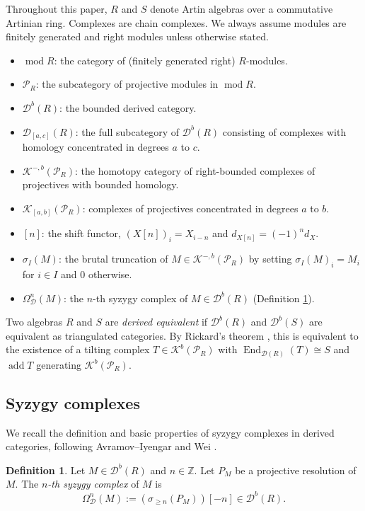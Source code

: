 \documentclass[12pt,a4paper,reqno]{amsart}
\theoremstyle{plain}
\theoremstyle{definition}
\newtheorem{definition}[theorem]{Definition}
\theoremstyle{remark}
\DeclareMathOperator{\modd}{mod}
\DeclareMathOperator{\End}{End}
\DeclareMathOperator{\add}{add}
\newcommand{\D}{\mathcal{D}}
\newcommand{\Db}{\mathcal{D}^b}
\newcommand{\K}{\mathcal{K}}
\newcommand{\PR}{\mathcal{P}_R}
\newcommand{\syz}{\Omega_{\mathcal{D}}}
\begin{document}
Throughout this paper, $R$ and $S$ denote Artin algebras over a commutative Artinian ring. Complexes are chain complexes. We always assume modules are finitely generated and right modules unless otherwise stated.

\begin{itemize}
\item $\modd R$: the category of (finitely generated right) $R$-modules.
\item $\PR$: the subcategory of projective modules in $\modd R$.
\item $\Db(R)$: the bounded derived category.
\item $\D_{[a,c]}(R)$: the full subcategory of $\Db(R)$ consisting of complexes with homology concentrated in degrees $a$ to $c$.
\item $\K^{-,b}(\PR)$: the homotopy category of right-bounded complexes of projectives with bounded homology.
\item $\K_{[a,b]}(\PR)$: complexes of projectives concentrated in degrees $a$ to $b$.
\item $[n]$: the shift functor, $(X[n])_i = X_{i-n}$ and $d_{X[n]} = (-1)^n d_X$.
\item $\sigma_I(M)$: the brutal truncation of $M \in \K^{-,b}(\PR)$ by setting $\sigma_I(M)_i = M_i$ for $i\in I$ and $0$ otherwise.
\item $\syz^n(M)$: the $n$-th syzygy complex of $M\in \Db(R)$ (Definition \ref{def:syzygy}).
\end{itemize}

Two algebras $R$ and $S$ are \emph{derived equivalent} if $\Db(R)$ and $\Db(S)$ are equivalent as triangulated categories. By Rickard's theorem \cite{Rickard}, this is equivalent to the existence of a tilting complex $T \in \K^b(\PR)$ with $\End_{\D(R)}(T) \cong S$ and $\add T$ generating $\K^b(\PR)$.

\subsection{Syzygy complexes}

We recall the definition and basic properties of syzygy complexes in derived categories, following Avramov--Iyengar \cite{AI} and Wei \cite{Wei}.

\begin{definition}\label{def:syzygy}
Let $M \in \Db(R)$ and $n \in \mathbb{Z}$. Let $P_M$ be a projective resolution of $M$. The \emph{$n$-th syzygy complex} of $M$ is
\[
\syz^n(M) := (\sigma_{\geq n}(P_M))[-n] \in \Db(R).
\]
\end{definition}
\end{document}
